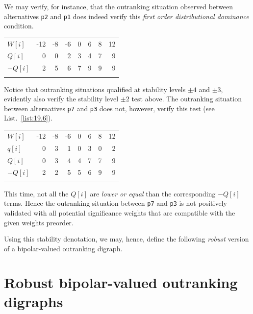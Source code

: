 We may verify, for instance, that the outranking situation observed between alternatives \texttt{p2} and \texttt{p1} does indeed verify this \emph{first order distributional dominance} condition. \hfill
\begin{center}
\begin{tabular}{l|r|r|r|r|r|r|r}
 \svhline\noalign{\smallskip}
  $W[i]$ & -12 & -8  & -6  &  0  &  6  &  8 &  12\\  
 \noalign{\smallskip}\hline\noalign{\smallskip}
  $Q[i]$  &  0 &  0 &   2 &   3  &  4  &  7  &  9 \\
  $-Q[i]$  &  2 &  5 &   6 &   7  &  9  &  9  &  9 \\
 \noalign{\smallskip}\hline
\end{tabular}
\end{center}

Notice that outranking situations qualified at stability levels $\pm 4$ and $\pm 3$, evidently also verify the stability level $\pm 2$ test above. The outranking situation between alternatives \texttt{p7} and \texttt{p3} does not, however, verify this test (see List.~\vref{list:19.6}).\hfill
\begin{center}
\begin{tabular}{l|r|r|r|r|r|r|r}
 \svhline\noalign{\smallskip}
  $W[i]$ & -12 & -8  & -6  &  0  &  6  &  8 &  12\\  
 \noalign{\smallskip}\hline\noalign{\smallskip}
  $q[i]$  &  0 &  3 &   1 &   0  &  3  &  0  &  2 \\
  $Q[i]$  &  0 &  3 &   4 &   4  &  7  &  7  &  9 \\
  $-Q[i]$  &  2 &  2 &   5 &   5  &  6  &  9  &  9 \\
 \noalign{\smallskip}\hline
\end{tabular}
\end{center}
This time, not all the $Q[i]$ are \emph{lower or equal} than the corresponding $-Q[i]$ terms. Hence the outranking situation between \texttt{p7} and \texttt{p3} is not positively validated with all potential significance weights that are compatible with the given weights preorder.

Using this stability denotation, we may, hence, define the following \emph{robust} version of a bipolar-valued outranking digraph.

\section{Robust bipolar-valued outranking digraphs}
\label{sec:19.4}


